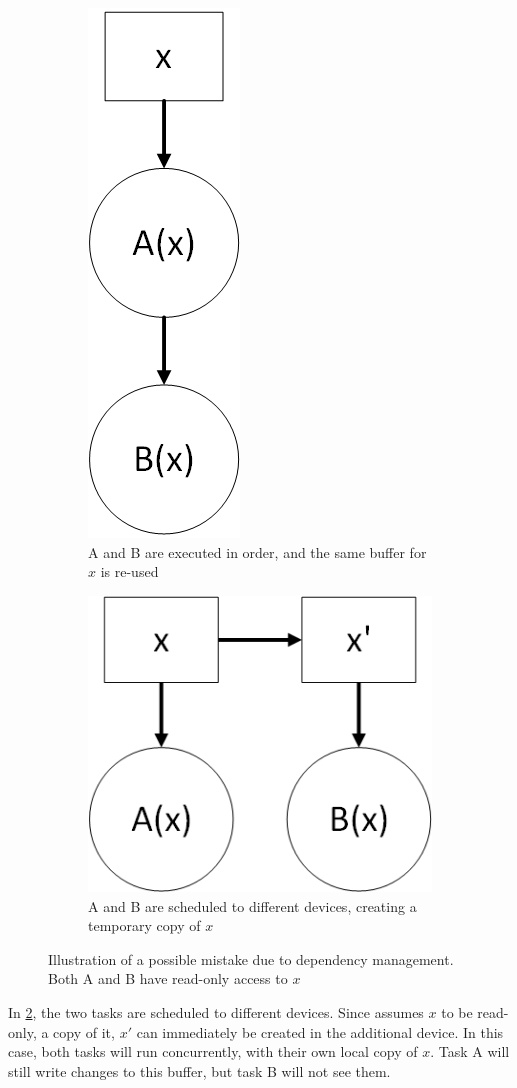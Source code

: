 \documentclass[main.tex]{subfiles}
\begin{document}
\begin{figure}[!htp]
  \centering
  \begin{subfigure}[b]{.5\textwidth}
    \centering
    \includegraphics[width=0.2\linewidth]{visio/starpu_dep_rw}
    \caption{A and B are executed in order, and the same buffer for $x$ is re-used}
    \label{fig:deps_problem:a}
  \end{subfigure}%
  \begin{subfigure}[b]{.5\textwidth}
    \centering
    \includegraphics[width=0.5\linewidth]{visio/starpu_dep_rw_caveat}
    \caption{A and B are scheduled to different devices, creating a temporary copy of $x$}
    \label{fig:deps_problem:b}
  \end{subfigure}
  \caption[\starpu dependency management caveat]{Illustration of a possible mistake due to dependency management. Both A and B have read-only access to $x$}
  \label{fig:deps_problem}
\end{figure}

In \cref{fig:deps_problem:b}, the two tasks are scheduled to different devices. Since \starpu assumes $x$ to be read-only, a copy of it, $x'$ can immediately be created in the additional device. In this case, both tasks will run concurrently, with their own local copy of $x$. Task A will still write changes to this buffer, but task B will not see them.
\end{document}
